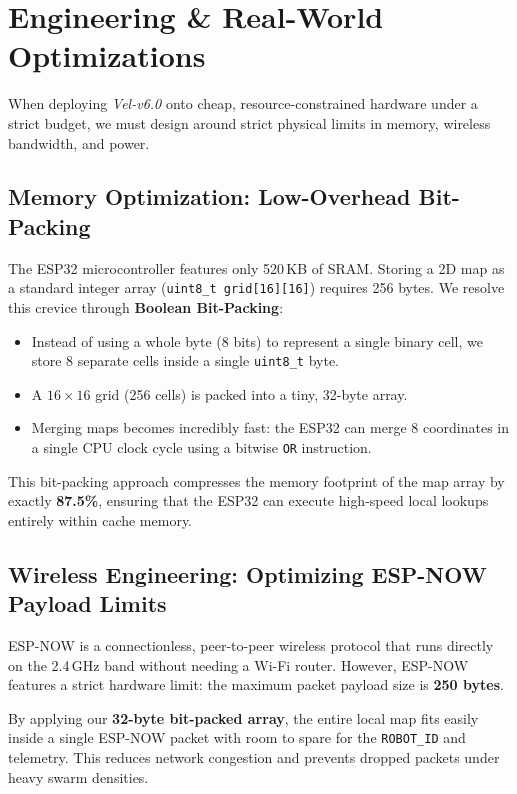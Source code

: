 \documentclass[journal,twoside]{IEEEtran}
\begin{document}
\section{Engineering \& Real-World Optimizations}
\label{sec:engineering}

When deploying \textit{Vel-v6.0} onto cheap, resource-constrained hardware under a strict budget, we must design around strict physical limits in memory, wireless bandwidth, and power.

\subsection{Memory Optimization: Low-Overhead Bit-Packing}
The ESP32 microcontroller features only 520\,KB of SRAM. Storing a 2D map as a standard integer array (\texttt{uint8\_t grid[16][16]}) requires 256 bytes. We resolve this crevice through \textbf{Boolean Bit-Packing}:
\begin{itemize}
    \item Instead of using a whole byte (8 bits) to represent a single binary cell, we store 8 separate cells inside a single \texttt{uint8\_t} byte.
    \item A $16 \times 16$ grid (256 cells) is packed into a tiny, 32-byte array.
    \item Merging maps becomes incredibly fast: the ESP32 can merge 8 coordinates in a single CPU clock cycle using a bitwise \texttt{OR} instruction.
\end{itemize}

This bit-packing approach compresses the memory footprint of the map array by exactly \textbf{87.5\%}, ensuring that the ESP32 can execute high-speed local lookups entirely within cache memory.

\subsection{Wireless Engineering: Optimizing ESP-NOW Payload Limits}
\label{sec:wireless}
ESP-NOW is a connectionless, peer-to-peer wireless protocol that runs directly on the 2.4\,GHz band without needing a Wi-Fi router. However, ESP-NOW features a strict hardware limit: the maximum packet payload size is \textbf{250 bytes}.

By applying our \textbf{32-byte bit-packed array}, the entire local map fits easily inside a single ESP-NOW packet with room to spare for the \texttt{ROBOT\_ID} and telemetry. This reduces network congestion and prevents dropped packets under heavy swarm densities.
\end{document}
